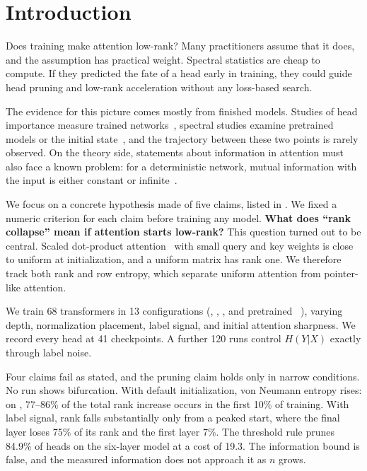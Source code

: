 \section{Introduction}
\label{sec:intro}

Does training make attention low-rank? Many practitioners assume that it does, and the assumption has practical weight. Spectral statistics are cheap to compute. If they predicted the fate of a head early in training, they could guide head pruning and low-rank acceleration without any loss-based search.

The evidence for this picture comes mostly from finished models. Studies of head importance measure trained networks~\citep{michel2019sixteen,voita2019analyzing}, spectral studies examine pretrained models or the initial state~\citep{wang2020linformer,naitsaada2024mind}, and the trajectory between these two points is rarely observed. On the theory side, statements about information in attention must also face a known problem: for a deterministic network, mutual information with the input is either constant or infinite~\citep{saxe2018information,goldfeld2019estimating}.

We focus on a concrete hypothesis made of five claims, listed in . We fixed a numeric criterion for each claim before training any model. {\bf What does ``rank collapse'' mean if attention starts low-rank?} This question turned out to be central. Scaled dot-product attention~\citep{vaswani2017attention} with small query and key weights is close to uniform at initialization, and a uniform matrix has rank one. We therefore track both rank and row entropy, which separate uniform attention from pointer-like attention.

We train 68 transformers in 13 configurations (\agnews, \sst, \cifar, and pretrained \bert~\citep{devlin2018bert}), varying depth, normalization placement, label signal, and initial attention sharpness. We record every head at 41 checkpoints. A further 120 runs control $H(Y|X)$ exactly through label noise.

Four claims fail as stated, and the pruning claim holds only in narrow conditions. No run shows bifurcation. With default initialization, von Neumann entropy rises: on \agnews, 77--86\% of the total rank increase occurs in the first 10\% of training. With label signal, rank falls substantially only from a peaked start, where the final layer loses 75\% of its rank and the first layer 7\%. The threshold rule prunes 84.9\% of heads on the six-layer \agnews model at a cost of 19.3\pp. The information bound is false, and the measured information does not approach it as $n$ grows.

